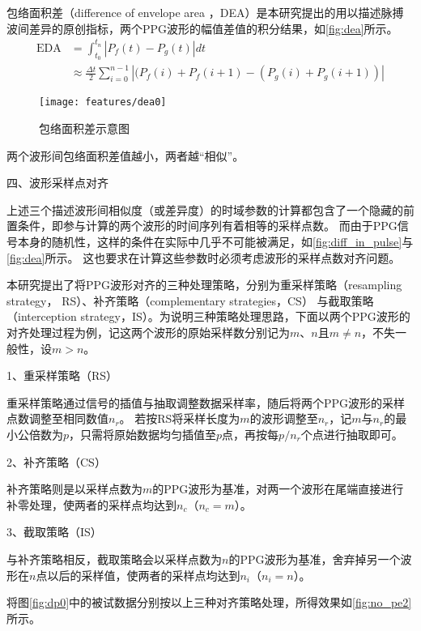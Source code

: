 包络面积差（difference of envelope area ，DEA）是本研究提出的用以描述脉搏波间差异的原创指标，两个PPG波形的幅值差值的积分结果，如\autoref{fig:dea}所示。
\begin{equation}
    \label{equ:dea}
    \begin{aligned}
        \text{EDA} &= \int_{t_0}^{t_n}|P_f(t)-P_g(t)|dt\\
        &\approx \frac{\Delta t}{2} \sum_{i=0}^{n-1}{|(P_f(i)+P_f(i+1)-(P_g(i)+P_g(i+1))|}
    \end{aligned}
\end{equation}
\begin{figure}[htbp]
  \centering
  \texttt{[image: features/dea0]}
  \caption[包络面积差示意图]{\label{fig:dea}包络面积差示意图}
\end{figure}

两个波形间包络面积差值越小，两者越“相似”。

四、波形采样点对齐

上述三个描述波形间相似度（或差异度）的时域参数的计算都包含了一个隐藏的前置条件，即参与计算的两个波形的时间序列有着相等的采样点数。
而由于PPG信号本身的随机性，这样的条件在实际中几乎不可能被满足，如\autoref{fig:diff_in_pulse}与\autoref{fig:dea}所示\cite{Qiu2012,PPGYY,Ma2015}。
这也要求在计算这些参数时必须考虑波形的采样点数对齐问题。

本研究提出了将PPG波形对齐的三种处理策略，分别为重采样策略（resampling strategy， RS）、补齐策略（complementary strategies，CS）
与截取策略（interception strategy，IS）。为说明三种策略处理思路，下面以两个PPG波形的对齐处理过程为例，记这两个波形的原始采样数分别记为$m$、$n$且$m \neq n$，不失一般性，设$m>n$。

1、重采样策略（RS）

重采样策略通过信号的插值与抽取调整数据采样率，随后将两个PPG波形的采样点数调整至相同数值$n_r$。
若按RS将采样长度为$m$的波形调整至$n_r$，记$m$与$n_r$的最小公倍数为$p$，只需将原始数据均匀插值至$p$点，再按每$p/n_r$个点进行抽取即可。

2、补齐策略（CS）

补齐策略则是以采样点数为$m$的PPG波形为基准，对两一个波形在尾端直接进行补零处理，使两者的采样点均达到$n_c$（$n_c=m$）。

3、截取策略（IS）

与补齐策略相反，截取策略会以采样点数为$n$的PPG波形为基准，舍弃掉另一个波形在$n$点以后的采样值，使两者的采样点均达到$n_i$（$n_i=n$）。

将图\autoref{fig:dp0}中的被试数据分别按以上三种对齐策略处理，所得效果如\autoref{fig:no_pe2}所示。

